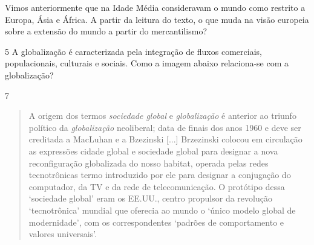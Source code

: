 Vimos anteriormente que na Idade Média consideravam o mundo como
restrito a Europa, Ásia e África. A partir da leitura do texto, o que
muda na visão europeia sobre a extensão do mundo a partir do
mercantilismo?

\linhas[4]


\num{5} A globalização é caracterizada pela integração de fluxos comerciais,
populacionais, culturais e sociais. Como a imagem abaixo relaciona-se
com a globalização?

\linhas[5]



\num{7}

\begin{quote}
A origem dos termos \emph{sociedade global}
e \emph{globalização} é anterior ao triunfo político
da \emph{globalização} neoliberal; data
de finais dos anos 1960 e deve ser creditada a MacLuhan e a Bzezinski
{[}...{]} Brzezinski colocou em circulação as expressões cidade global e
sociedade global para designar a nova reconfiguração globalizada do
nosso habitat, operada pelas redes tecnotrônicas termo introduzido por
ele para designar a conjugação do computador, da TV e da rede de
telecomunicação. O protótipo dessa `sociedade global' eram os EE.UU.,
centro propulsor da revolução `tecnotrônica' mundial que oferecia ao
mundo o `único modelo global de modernidade', com os correspondentes
`padrões de comportamento e valores universais'.

\end{quote}

